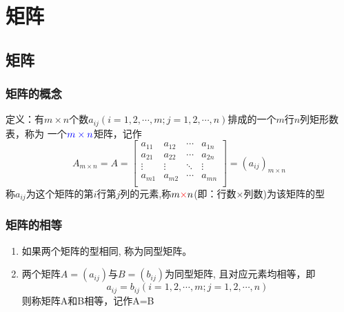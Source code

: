 \chapter{矩阵}
\section{矩阵}
\subsection{矩阵的概念}
{\color{red}定义：}有$m\times n$个数$a_{ij}(i=1,2,\cdots,m;j=1,2,\cdots,n)$排成的一个$m$行$n$列矩形数表，称为
一个${\color{blue}m\times n}$矩阵，记作
$$
A_{m\times n}=A=
\left[ \begin{matrix}
    {{a}_{11}} & {{a}_{12}} & \cdots  & {{a}_{1n}}  \\
    {{a}_{21}} & {{a}_{22}} & \cdots  & {{a}_{2n}}  \\
    \vdots  & \vdots  & {\ddots} & \vdots   \\
    {{a}_{m1}} & {{a}_{m2}} & \cdots  & {{a}_{mn}}  \\
 \end{matrix} \right] 
=(a_{ij})_{m\times n}
$$
称$a_{ij}$为这个矩阵的第$i$行第$j$列的元素,称$m{\color{red}\times} n$(即：行数$\times$列数)为该{\color{blue}矩阵的型}\\
\subsection{矩阵的相等}
\begin{enumerate}
    \item{如果两个矩阵的型相同, 称为同型矩阵。}
    \item{
        两个矩阵$A=(a_{ij})$与$B=(b_{ij})$为同型矩阵, 且对应元素均相等，即
        $$
        a_{ij}=b_{ij}(i=1,2,\cdots,m;j=1,2,\cdots,n)
        $$
        则称矩阵A和B相等，记作A=B
        }
\end{enumerate}
